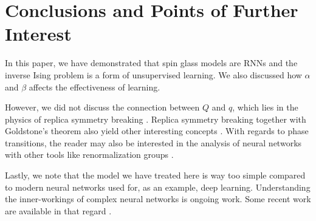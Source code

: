 \documentclass[%
 reprint,
 amsmath,amssymb,
 aps,
]{revtex4-2}
\begin{document}
\section{Conclusions and Points of Further Interest}

In this paper, we have demonstrated that spin glass models are RNNs and the inverse Ising problem is a form of unsupervised learning. We also discussed how $\alpha$ and $\beta$ affects the effectiveness of learning. 

However, we did not discuss the connection between $Q$ and $q$, which lies in the physics of replica symmetry breaking \cite{huang2021statistical_replica_sym_break,Castellani_2005}. Replica symmetry breaking together with Goldstone's theorem also yield other interesting concepts \cite{Fedorenko_2003}. With regards to phase transitions, the reader may also be interested in the analysis of neural networks with other tools like renormalization groups \cite{li2018neural}. 

Lastly, we note that the model we have treated here is way too simple compared to modern neural networks used for, as an example, deep learning.  Understanding the inner-workings of complex neural networks is ongoing work. Some recent work are available in that regard \cite{doi:10.1146/annurev-conmatphys-031119-050745}.


\newpage
\end{document}
